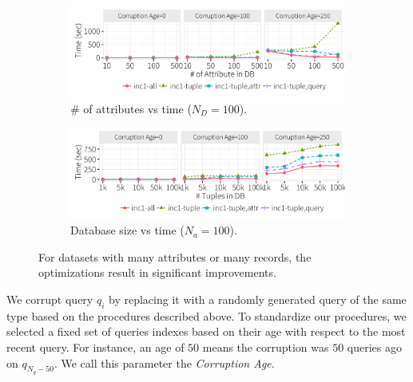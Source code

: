  \begin{figure}[!htb]
    \vspace*{-.1in}
    \centering
    \begin{subfigure}[t]{.49\textwidth}
    \includegraphics[width = .99\columnwidth]{figures/attr_time}
    \vspace*{-.1in}
    \caption{\# of attributes vs time ($N_D = 100$).}
    \label{f:attr} 
    \end{subfigure}
    \begin{subfigure}[t]{.49\textwidth}
    \includegraphics[width = .99\columnwidth]{figures/attr100_time}
    \vspace*{-.1in}
    \caption{Database size vs time ($N_a = 100$).}
    \label{f:attr100} 
    \end{subfigure}
    \vspace*{-.1in}
    \caption{For datasets with many attributes or many records, the optimizations result in significant improvements.}
    \label{f:database}
    \vspace{-2mm}
  \end{figure}

 We corrupt query $q_i$ by replacing it with a randomly
generated query of the same type based on the procedures described above.
To standardize our procedures, we selected a fixed set of queries indexes based on their age with respect to the most recent query.
For instance, an age of $50$ means the corruption was $50$ queries ago on $q_{N_q-50}$.
We call this parameter the {\it Corruption Age}.




